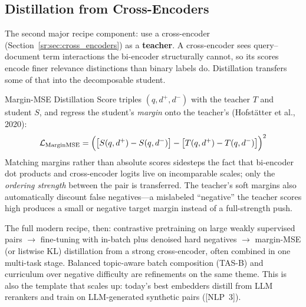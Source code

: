 \subsection{Distillation from Cross-Encoders}
\label{sr:subsec:ce_distillation}

The second major recipe component: use a cross-encoder (Section~\ref{sr:sec:cross_encoders}) as a \textbf{teacher}. A cross-encoder sees query--document term interactions the bi-encoder structurally cannot, so its scores encode finer relevance distinctions than binary labels do. Distillation transfers some of that into the decomposable student.

\begin{mathresult}{Margin-MSE Distillation}
Score triples $(q, d^+, d^-)$ with the teacher $T$ and student $S$, and regress the student's \textit{margin} onto the teacher's (Hofst\"atter et al., 2020):
\[
\mathcal{L}_{\text{MarginMSE}} = \Big( \big[ S(q,d^+) - S(q,d^-) \big] - \big[ T(q,d^+) - T(q,d^-) \big] \Big)^2
\]
Matching margins rather than absolute scores sidesteps the fact that bi-encoder dot products and cross-encoder logits live on incomparable scales; only the \textit{ordering strength} between the pair is transferred. The teacher's soft margins also automatically discount false negatives---a mislabeled ``negative'' the teacher scores high produces a small or negative target margin instead of a full-strength push.
\end{mathresult}

The full modern recipe, then: contrastive pretraining on large weakly supervised pairs $\to$ fine-tuning with in-batch plus denoised hard negatives $\to$ margin-MSE (or listwise KL) distillation from a strong cross-encoder, often combined in one multi-task stage. Balanced topic-aware batch composition (TAS-B) and curriculum over negative difficulty are refinements on the same theme. This is also the template that scales up: today's best embedders distill from LLM rerankers and train on LLM-generated synthetic pairs ([NLP~3]).

